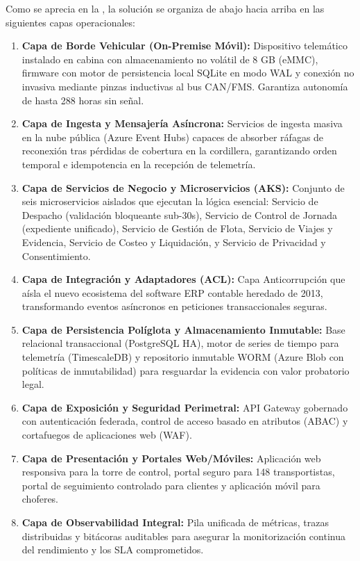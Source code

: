 
Como se aprecia en la , la solución se organiza de abajo hacia arriba en las
siguientes capas operacionales:

\begin{enumerate}
  \item \textbf{Capa de Borde Vehicular (On-Premise Móvil):} Dispositivo telemático instalado en cabina con
  almacenamiento no volátil de 8 GB (eMMC), firmware con motor de persistencia local SQLite en modo WAL y
  conexión no invasiva mediante pinzas inductivas al bus CAN/FMS. Garantiza autonomía de hasta 288 horas sin señal.
  \item \textbf{Capa de Ingesta y Mensajería Asíncrona:} Servicios de ingesta masiva en la nube pública
  (Azure Event Hubs) capaces de absorber ráfagas de reconexión tras pérdidas de cobertura en la cordillera,
  garantizando orden temporal e idempotencia en la recepción de telemetría.
  \item \textbf{Capa de Servicios de Negocio y Microservicios (AKS):} Conjunto de seis microservicios aislados
  que ejecutan la lógica esencial: Servicio de Despacho (validación bloqueante sub-30s), Servicio de Control de
  Jornada (expediente unificado), Servicio de Gestión de Flota, Servicio de Viajes y Evidencia, Servicio de
  Costeo y Liquidación, y Servicio de Privacidad y Consentimiento.
  \item \textbf{Capa de Integración y Adaptadores (ACL):} Capa Anticorrupción que aísla el nuevo ecosistema del
  software ERP contable heredado de 2013, transformando eventos asíncronos en peticiones transaccionales seguras.
  \item \textbf{Capa de Persistencia Políglota y Almacenamiento Inmutable:} Base relacional transaccional
  (PostgreSQL HA), motor de series de tiempo para telemetría (TimescaleDB) y repositorio inmutable WORM
  (Azure Blob con políticas de inmutabilidad) para resguardar la evidencia con valor probatorio legal.
  \item \textbf{Capa de Exposición y Seguridad Perimetral:} API Gateway gobernado con autenticación federada,
  control de acceso basado en atributos (ABAC) y cortafuegos de aplicaciones web (WAF).
  \item \textbf{Capa de Presentación y Portales Web/Móviles:} Aplicación web responsiva para la torre de control,
  portal seguro para 148 transportistas, portal de seguimiento controlado para clientes y aplicación móvil para choferes.
  \item \textbf{Capa de Observabilidad Integral:} Pila unificada de métricas, trazas distribuidas y bitácoras
  auditables para asegurar la monitorización continua del rendimiento y los SLA comprometidos.
\end{enumerate}

